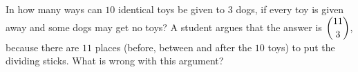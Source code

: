 In how many ways can $10$ identical toys be given to $3$ dogs, if every toy is given away and some dogs may get no toys? A student argues that the answer is $\dbinom{11}{3}$, because there are $11$ places (before, between and after the $10$ toys) to put the dividing sticks. What is wrong with this argument?

